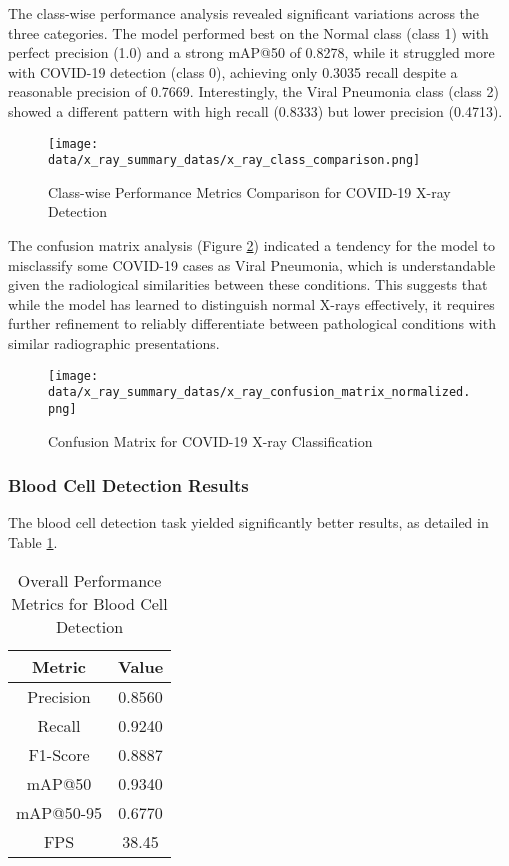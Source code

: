 \begin{multicols}{2}
The class-wise performance analysis revealed significant variations across the three categories. The model performed best on the Normal class (class 1) with perfect precision (1.0) and a strong mAP@50 of 0.8278, while it struggled more with COVID-19 detection (class 0), achieving only 0.3035 recall despite a reasonable precision of 0.7669. Interestingly, the Viral Pneumonia class (class 2) showed a different pattern with high recall (0.8333) but lower precision (0.4713).

\begin{figure}[h]
\centering
\texttt{[image: data/x\_ray\_summary\_datas/x\_ray\_class\_comparison.png]}
\caption{Class-wise Performance Metrics Comparison for COVID-19 X-ray Detection}
\label{fig:covid_class_metrics}
\end{figure}

The confusion matrix analysis (Figure \ref{fig:covid_confusion}) indicated a tendency for the model to misclassify some COVID-19 cases as Viral Pneumonia, which is understandable given the radiological similarities between these conditions. This suggests that while the model has learned to distinguish normal X-rays effectively, it requires further refinement to reliably differentiate between pathological conditions with similar radiographic presentations.

\begin{figure}[h]
\centering
\texttt{[image: data/x\_ray\_summary\_datas/x\_ray\_confusion\_matrix\_normalized.png]}
\caption{Confusion Matrix for COVID-19 X-ray Classification}
\label{fig:covid_confusion}
\end{figure}

\subsubsection{Blood Cell Detection Results}

The blood cell detection task yielded significantly better results, as detailed in Table \ref{tab:blood_cell_results}.

\begin{table}[h]
\centering
\begin{tabular}{|c|c|}
\hline
\textbf{Metric} & \textbf{Value} \\
\hline
Precision & 0.8560 \\
Recall & 0.9240 \\
F1-Score & 0.8887 \\
mAP@50 & 0.9340 \\
mAP@50-95 & 0.6770 \\
FPS & 38.45 \\
\hline
\end{tabular}
\caption{Overall Performance Metrics for Blood Cell Detection}
\label{tab:blood_cell_results}
\end{table}


\end{multicols}
